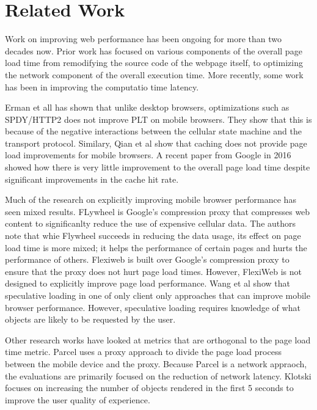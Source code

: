\section{Related Work}
\label{sec:related}

Work on improving web performance has been ongoing for more than two decades now. 
Prior work has focused on various components of the overall page load time
from remodifying the source code of the webpage itself, to optimizing the
network component of the overall execution time. More recently, some work
has been in improving the computatio time latency. 

Erman et all \cite{erman2013conext} %
has shown that unlike desktop browsers, optimizations such as SPDY/HTTP2 does not improve
PLT on mobile browsers. They show that this is because of the negative interactions
between the cellular state machine and the transport protocol. Similary, Qian
et al \cite{quian2012mobisys} %
show that caching does not provide
page load improvements for mobile browsers. 
A recent paper from Google in 2016 \cite{vesuna2016caching} %
showed how there is very little improvement to the overall page load time despite 
significant improvements in the cache hit rate. 

Much of the research on explicitly improving mobile browser performance has seen mixed results.
FLywheel \cite{agababov2015nsdi} is Google's compression proxy that compresses web content to significanlty 
reduce the use of expensive cellular data. The authors note that whie Flywheel succeeds in
reducing the data usage, its effect on page load time is more mixed; it helps
the performance of certain pages and hurts the performance of others. Flexiweb \cite{singh2015mobicom} is built over
Google's compression proxy to ensure that the proxy does not hurt page load times. However, FlexiWeb
is not designed to explicitly improve page load performance. Wang et al \cite{wang2013demystifying} show that
speculative loading in one of only client only approaches that can improve mobile
browser performance. However, speculative loading requires knowledge of what objects are likely
to be requested by the user. 

Other research works have looked at metrics that are orthogonal to the page load time metric. Parcel
\cite{sivakumar2014conext} %
 uses a proxy
approach to divide the page load process between the mobile device and the proxy. Because Parcel is
a network appraoch, the evaluations are primarily focused on the reduction of network
latency. Klotski \cite{butkiewicz2015usenix} focuses on increasing the number of objects rendered in the first
5 seconds to improve the user quality of experience. 

